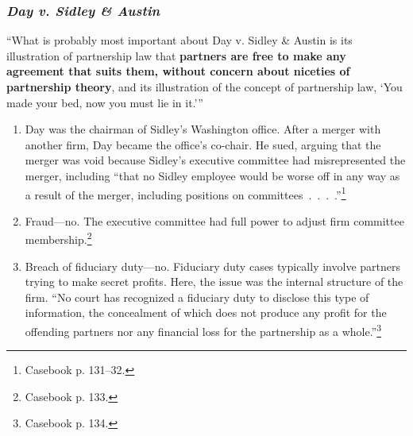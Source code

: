 \subsubsection{\emph{Day v. Sidley \& Austin}}

\enquote{What is probably most important about Day v. Sidley \& Austin is its 
illustration of partnership law that \textbf{partners are free to make any agreement 
that suits them, without concern about niceties of partnership theory}, and 
its illustration of the concept of partnership law, \enquote{You made your 
bed, now you must lie in it.}}

\begin{enumerate}
    \item Day was the chairman of Sidley's Washington office. After a merger 
    with another firm, Day became the office's co-chair. He sued, arguing that 
    the merger was void because Sidley's executive committee had 
    misrepresented the merger, including ``that no Sidley employee would be 
    worse off in any way as a result of the merger, including positions on 
    committees~.~.~.~.''\footnote{Casebook p. 131--32.}
    \item Fraud---no. The executive committee had full power to adjust firm 
    committee membership.\footnote{Casebook p. 133.}
    \item Breach of fiduciary duty---no. Fiduciary duty cases typically 
    involve partners trying to make secret profits. Here, the issue was the 
    internal structure of the firm. ``No court has recognized a fiduciary duty 
    to disclose this type of information, the concealment of which does not 
    produce any profit for the offending partners nor any financial loss for 
    the partnership as a whole.''\footnote{Casebook p. 134.}
\end{enumerate}

